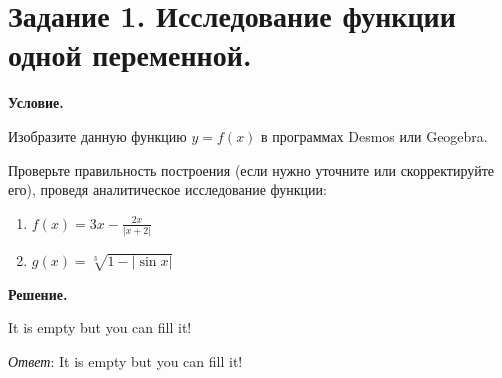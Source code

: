 \section{Задание 1. Исследование функции одной переменной.}

\textbf{Условие.}

Изобразите данную функцию $y = f(x)$ в программах Desmos или Geogebra.

Проверьте правильность построения (если нужно уточните или скорректируйте его), проведя аналитическое исследование функции:

\begin{enumerate}
    \item $\displaystyle f(x) = 3x - \frac{2x}{|x + 2|}$
    \item $\displaystyle g(x) = \sqrt[3]{1 - |\sin{x}|}$
\end{enumerate}
\vspace{10mm}
\textbf{Решение.}

It is empty but you can fill it!

\textit{Ответ}: It is empty but you can fill it!
\clearpage
